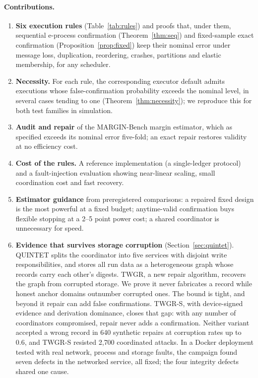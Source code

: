 \documentclass[pdflatex,sn-mathphys-num]{sn-jnl}
\theoremstyle{thmstyleone}
\theoremstyle{thmstyletwo}
\theoremstyle{thmstylethree}
\begin{document}
\paragraph{Contributions.}
\begin{enumerate}
\item[C1] \textbf{Six execution rules} (Table~\ref{tab:rules}) and proofs that, under them, sequential e-process confirmation (Theorem~\ref{thm:seq}) and fixed-sample exact confirmation (Proposition~\ref{prop:fixed}) keep their nominal error under message loss, duplication, reordering, crashes, partitions and elastic membership, for any scheduler.
\item[C2] \textbf{Necessity.} For each rule, the corresponding executor default admits executions whose false-confirmation probability exceeds the nominal level, in several cases tending to one (Theorem~\ref{thm:necessity}); we reproduce this for both test families in simulation.
\item[C3] \textbf{Audit and repair} of the MARGIN-Bench margin estimator, which as specified exceeds its nominal error five-fold; an exact repair restores validity at no efficiency cost.
\item[C4] \textbf{Cost of the rules.} A reference implementation (a single-ledger protocol) and a fault-injection evaluation showing near-linear scaling, small coordination cost and fast recovery.
\item[C5] \textbf{Estimator guidance} from preregistered comparisons: a repaired fixed design is the most powerful at a fixed budget; anytime-valid confirmation buys flexible stopping at a 2--5 point power cost; a shared coordinator is unnecessary for speed.
\item[C6] \textbf{Evidence that survives storage corruption} (Section~\ref{sec:quintet}). QUINTET splits the coordinator into five services with disjoint write responsibilities, and stores all run data as a heterogeneous graph whose records carry each other's digests. TWGR, a new repair algorithm, recovers the graph from corrupted storage. We prove it never fabricates a record while honest anchor domains outnumber corrupted ones. The bound is tight, and beyond it repair can add false confirmations. TWGR-S, with device-signed evidence and derivation dominance, closes that gap: with any number of coordinators compromised, repair never adds a confirmation. Neither variant accepted a wrong record in 640 synthetic repairs at corruption rates up to 0.6, and TWGR-S resisted 2{,}700 coordinated attacks. In a Docker deployment tested with real network, process and storage faults, the campaign found seven defects in the networked service, all fixed; the four integrity defects shared one cause.
\end{enumerate}
\end{document}
